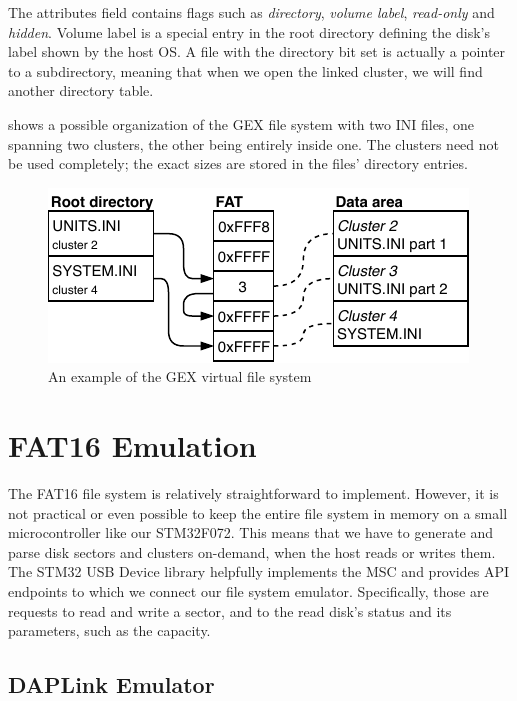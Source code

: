 The attributes field contains flags such as \textit{directory}, \textit{volume label}, \textit{read-only} and \textit{hidden}. Volume label is a special entry in the root directory defining the disk's label shown by the host \gls{OS}. A file with the directory bit set is actually a pointer to a subdirectory, meaning that when we open the linked cluster, we will find another directory table.

 shows a possible organization of the GEX file system with two INI files, one spanning two clusters, the other being entirely inside one. The clusters need not be used completely; the exact sizes are stored in the files' directory entries.

\begin{figure}[h]
	\centering
	\includegraphics[scale=1.3] {img/fat-links.pdf}
	\caption{\label{fig:fat_example}An example of the GEX virtual file system}
\end{figure}


\section{FAT16 Emulation}

The FAT16 file system is relatively straightforward to implement. However, it is not practical or even possible to keep the entire file system in memory on a small microcontroller like our STM32F072. This means that we have to generate and parse disk sectors and clusters on-demand, when the host reads or writes them. The STM32 \gls{USB} Device library helpfully implements the \gls{MSC} and provides \gls{API} endpoints to which we connect our file system emulator. Specifically, those are requests to read and write a sector, and to the read disk's status and its parameters, such as the capacity.

\subsection{DAPLink Emulator}

